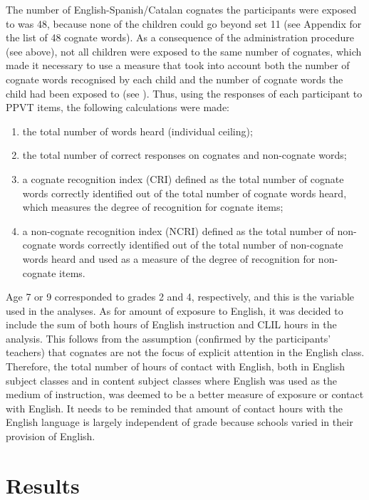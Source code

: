 \documentclass[output=paper,modfonts,nonflat,newtxmath]{langsci/langscibook}
\begin{document}
The number of English-Spanish/Catalan cognates the participants were exposed to was 48, because none of the children could go beyond set 11 (see Appendix for the list of 48 cognate words). As a consequence of the administration procedure (see above), not all children were exposed to the same number of cognates, which made it necessary to use a measure that took into account both the number of cognate words recognised by each child and the number of cognate words the child had been exposed to (see \citealt{MuñozEtAl2018}). Thus, using the responses of each participant to PPVT items, the following calculations were made: 

\begin{enumerate}[label=\alph*.]
\item the total number of words heard (individual ceiling); 
\item the total number of correct responses on cognates and non-cognate words; 
\item a cognate recognition index (CRI) defined as the total number of cognate words correctly identified out of the total number of cognate words heard, which measures the degree of recognition for cognate items; 
\item a non-cognate recognition index (NCRI) defined as the total number of non-cognate words correctly identified out of the total number of non-cognate words heard and used as a measure of the degree of recognition for non-cognate items.
\end{enumerate}

Age 7 or 9 corresponded to grades 2 and 4, respectively, and this is the variable used in the analyses. As for amount of exposure to English, it was decided to include the sum of both hours of English instruction and CLIL hours in the analysis. This follows from the assumption (confirmed by the participants’ teachers) that cognates are not the focus of explicit attention in the English class. Therefore, the total number of hours of contact with English, both in English subject classes and in content subject classes where English was used as the medium of instruction, was deemed to be a better measure of exposure or contact with English. It needs to be reminded that amount of contact hours with the English language is largely independent of grade because schools varied in their provision of English.


\section{Results}\label{sec:munoz:4}
\end{document}
